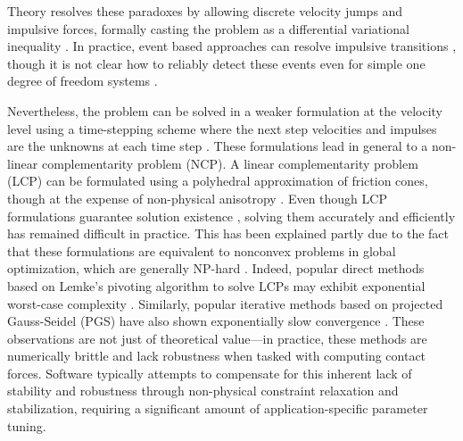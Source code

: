 %
Theory resolves these paradoxes by allowing discrete velocity jumps and
impulsive forces, formally casting the problem as a differential variational
inequality \cite{bib:pang2008differential}. In practice, event based approaches
can resolve impulsive transitions \cite{bib:haug1986}, though it is not clear
how to reliably detect these events even for simple one degree of freedom
systems \cite{bib:hogan2017regularization}.

Nevertheless, the problem can be solved in a weaker formulation at the velocity
level using a time-stepping scheme where the next step velocities and impulses
are the unknowns at each time step \cite{bib:stewart1996implicit,
bib:anitescu1997}. These formulations lead in general to a non-linear
complementarity problem (NCP). A linear complementarity problem (LCP) can be
formulated using a polyhedral approximation of friction cones, though at the
expense of non-physical anisotropy \cite{bib:li2018implicit}. Even though LCP
formulations guarantee solution existence \cite{bib:anitescu1997,
bib:stewart1998convergence}, solving them accurately and efficiently has
remained difficult in practice. This has been explained partly due to the fact
that these formulations are equivalent to nonconvex problems in global
optimization, which are generally NP-hard \cite{bib:Kaufman2008}. Indeed,
popular direct methods based on Lemke's pivoting algorithm to solve LCPs may
exhibit exponential worst-case complexity \cite{bib:baraff1994fast}. Similarly,
popular iterative methods based on projected Gauss-Seidel (PGS)
\cite{bib:duriez2006_realistic_haptic_rendering, bib:bullet} have also shown
exponentially slow convergence \cite{bib:erleben2007velocity}. These
observations are not just of theoretical value---in practice, these methods are
numerically brittle and lack robustness when tasked with computing contact
forces. Software typically attempts to compensate for this inherent lack of
stability and robustness through non-physical constraint relaxation and
stabilization, requiring a significant amount of application-specific parameter
tuning.

